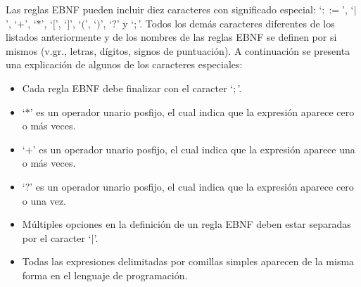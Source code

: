 Las reglas EBNF pueden incluir diez caracteres con significado especial: `$::=$', `$|$', `$+$', `$*$', `$[$', `$]$', `$($', `$)$', `$?$' y `$;$'. Todos los dem\'as caracteres diferentes de los listados anteriormente y de los nombres de las reglas EBNF se definen por si mismos (v.gr., letras, d\'igitos, signos de puntuaci\'on). A continuaci\'on se presenta una explicaci\'on de algunos de los caracteres especiales:

\begin{itemize}
\item Cada regla EBNF debe finalizar con el caracter `$;$'. 
\item `$*$' es un operador unario posfijo, el cual indica que la expresi\'on aparece cero o m\'as veces. 
\item `$+$' es un operador unario posfijo, el cual indica que la expresi\'on aparece una o m\'as veces.
\item `$?$' es un operador unario posfijo, el cual indica que la expresi\'on aparece cero o una vez.
\item M\'ultiples opciones en la definici\'on de un regla EBNF deben estar separadas por el caracter `$|$'.
\item Todas las expresiones delimitadas por comillas simples aparecen de la misma forma en el lenguaje de programaci\'on.
\end{itemize}

